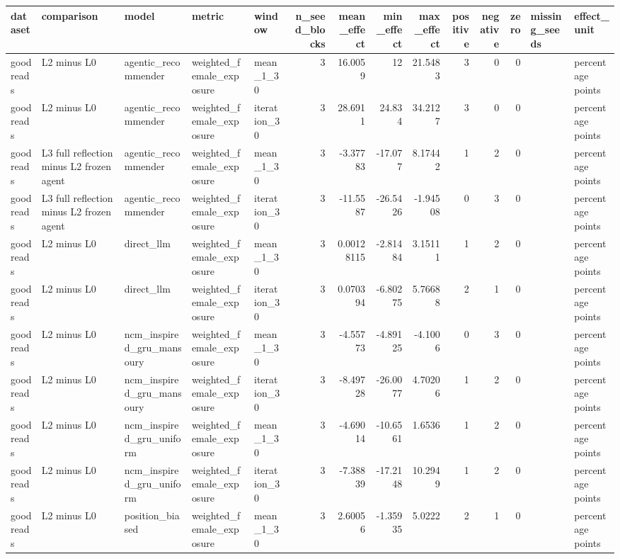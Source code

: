 \begin{table}[htbp!]
\centering
\small
\setlength{\tabcolsep}{3pt}
\renewcommand{\arraystretch}{1.1}
\begin{tabular}{lllllrrrrrrrll}
\hline
dataset & comparison & model & metric & window & n\_seed\_blocks & mean\_effect & min\_effect & max\_effect & positive & negative & zero & missing\_seeds & effect\_unit \\
\hline
goodreads & L2 minus L0 & agentic\_recommender & weighted\_female\_exposure & mean\_1\_30 & 3 & 16.0059 & 12 & 21.5483 & 3 & 0 & 0 &  & percentage points \\
goodreads & L2 minus L0 & agentic\_recommender & weighted\_female\_exposure & iteration\_30 & 3 & 28.6911 & 24.834 & 34.2127 & 3 & 0 & 0 &  & percentage points \\
goodreads & L3 full reflection minus L2 frozen agent & agentic\_recommender & weighted\_female\_exposure & mean\_1\_30 & 3 & -3.37783 & -17.077 & 8.17442 & 1 & 2 & 0 &  & percentage points \\
goodreads & L3 full reflection minus L2 frozen agent & agentic\_recommender & weighted\_female\_exposure & iteration\_30 & 3 & -11.5587 & -26.5426 & -1.94508 & 0 & 3 & 0 &  & percentage points \\
goodreads & L2 minus L0 & direct\_llm & weighted\_female\_exposure & mean\_1\_30 & 3 & 0.00128115 & -2.81484 & 3.15111 & 1 & 2 & 0 &  & percentage points \\
goodreads & L2 minus L0 & direct\_llm & weighted\_female\_exposure & iteration\_30 & 3 & 0.070394 & -6.80275 & 5.76688 & 2 & 1 & 0 &  & percentage points \\
goodreads & L2 minus L0 & ncm\_inspired\_gru\_mansoury & weighted\_female\_exposure & mean\_1\_30 & 3 & -4.55773 & -4.89125 & -4.1006 & 0 & 3 & 0 &  & percentage points \\
goodreads & L2 minus L0 & ncm\_inspired\_gru\_mansoury & weighted\_female\_exposure & iteration\_30 & 3 & -8.49728 & -26.0077 & 4.70206 & 1 & 2 & 0 &  & percentage points \\
goodreads & L2 minus L0 & ncm\_inspired\_gru\_uniform & weighted\_female\_exposure & mean\_1\_30 & 3 & -4.69014 & -10.6561 & 1.6536 & 1 & 2 & 0 &  & percentage points \\
goodreads & L2 minus L0 & ncm\_inspired\_gru\_uniform & weighted\_female\_exposure & iteration\_30 & 3 & -7.38839 & -17.2148 & 10.2949 & 1 & 2 & 0 &  & percentage points \\
goodreads & L2 minus L0 & position\_biased & weighted\_female\_exposure & mean\_1\_30 & 3 & 2.60056 & -1.35935 & 5.0222 & 2 & 1 & 0 &  & percentage points \\

\end{tabular}
\end{table}
